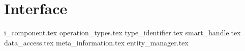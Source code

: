 \section{Interface}
{i_component.tex}
{operation_types.tex}
{type_identifier.tex}
{smart_handle.tex}
{data_access.tex}
{meta_information.tex}
{entity_manager.tex}
